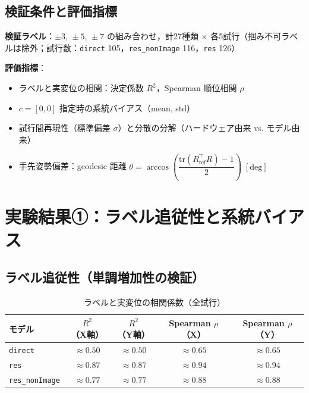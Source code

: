 \documentclass[a4paper,10pt]{jlreq}
\begin{document}
\subsection{検証条件と評価指標}

\textbf{検証ラベル}：$\pm3,\,\pm5,\,\pm7$ の組み合わせ，計27種類 $\times$ 各5試行（掴み不可ラベルは除外；試行数：\texttt{direct} 105，\texttt{res\_nonImage} 116，\texttt{res} 126）

\textbf{評価指標}：
\begin{itemize}
  \item ラベルと実変位の相関：決定係数 $R^2$，Spearman 順位相関 $\rho$
  \item $c=[0,0]$ 指定時の系統バイアス（mean, std）
  \item 試行間再現性（標準偏差 $\sigma$）と分散の分解（ハードウェア由来 vs. モデル由来）
  \item 手先姿勢偏差：geodesic 距離
    $\theta = \arccos\!\left(\dfrac{\mathrm{tr}(R_\mathrm{ref}^\top R)-1}{2}\right)\;[\mathrm{deg}]$
\end{itemize}

\clearpage

\section{実験結果①：ラベル追従性と系統バイアス}

\subsection{ラベル追従性（単調増加性の検証）}

\begin{table}[h]
  \centering\small
  \caption{ラベルと実変位の相関係数（全試行）}
  \begin{tabular}{lcccc}
    \toprule
    モデル & $R^2$（X軸） & $R^2$（Y軸） & Spearman $\rho$（X） & Spearman $\rho$（Y） \\
    \midrule
    \texttt{direct}        & $\approx 0.50$ & $\approx 0.50$ & $\approx 0.65$ & $\approx 0.65$ \\
    \texttt{res}           & $\approx 0.87$ & $\approx 0.87$ & $\approx 0.94$ & $\approx 0.94$ \\
    \texttt{res\_nonImage} & $\approx 0.77$ & $\approx 0.77$ & $\approx 0.88$ & $\approx 0.88$ \\
    \bottomrule
  \end{tabular}
\end{table}
\end{document}
